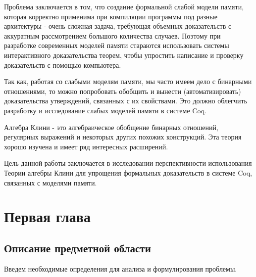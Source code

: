 \documentclass[times
              ]{itmo-student-thesis}
\begin{document}
Проблема заключается в том, что создание формальной слабой модели памяти, которая корректно применима при компиляции программы под разные архитектуры - очень сложная задача, требующая объемных доказательств с аккуратным рассмотрением большого количества случаев.
Поэтому при разработке современных моделей памяти стараются использовать системы интерактивного доказательства теорем\cite{rc11}, чтобы упростить написание и проверку доказательств с помощью компьютера.

Так как, работая со слабыми моделям памяти, мы часто имеем дело с бинарными отношениями, то можно попробовать обобщить и вынести (автоматизировать) доказательства утверждений, связанных с их свойствами.
Это должно облегчить разработку и исследование слабых моделей памяти в системе Coq.

Алгебра Клини - это алгебраическое обобщение бинарных отношений, регулярных выражений и некоторых других похожих конструкций.
Эта теория хорошо изучена и имеет ряд интересных расширений.

Цель данной работы заключается в исследовании перспективности использования Теории алгебры Клини для упрощения формальных доказательств в системе Coq, связанных с моделями памяти.

\chapter{Первая глава}
\startrelatedwork
  \section{Описание предметной области}
    Введем необходимые определения для анализа и формулирования проблемы.
\end{document}
